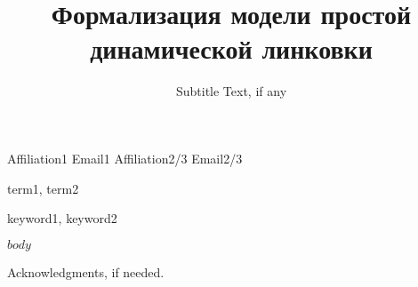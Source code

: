\documentclass[preprint,10pt,numbers]{sigplanconf}
\begin{document}
\setlength{\pdfpageheight}{\paperheight}
\setlength{\pdfpagewidth}{\paperwidth}



\title{Формализация модели простой динамической линковки}
\subtitle{Subtitle Text, if any}

           {Affiliation1}
           {Email1}
           {Affiliation2/3}
           {Email2/3}

\maketitle

\begin{abstract}

\end{abstract}


\terms
term1, term2

\keywords
keyword1, keyword2

$body$

\acks

Acknowledgments, if needed.






\end{document}
